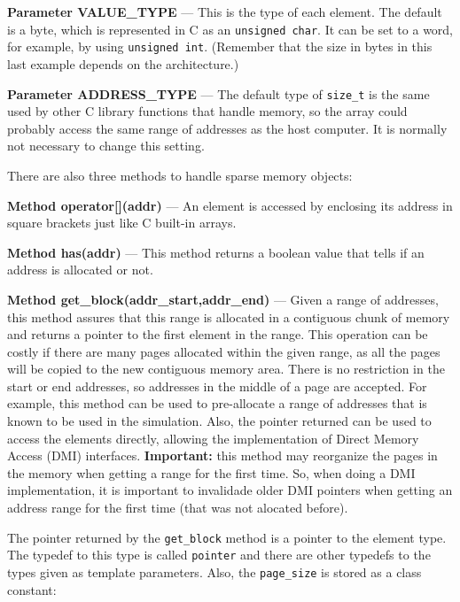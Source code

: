 \documentclass[12pt,oneside]{gsbook}
\begin{document}
\textbf{Parameter VALUE\_TYPE} --- This is the type of each
element. The default is a byte, which is represented in C as an
\texttt{unsigned char}. It can be set to a word, for example, by using
\texttt{unsigned int}. (Remember that the size in bytes in this
last example depends on the architecture.)

\textbf{Parameter ADDRESS\_TYPE} --- The default type of
\texttt{size\_t} is the same used by other C library functions that
handle memory, so the array could probably access the same range of
addresses as the host computer. It is normally not necessary to change
this setting.

\vspace{5pt}

There are also three methods to handle sparse memory objects:

\vspace{5pt}

\textbf{Method operator[](addr)} --- An element is accessed by
enclosing its address in square brackets just like C built-in arrays.

\textbf{Method has(addr)} --- This method returns a boolean value that
tells if an address is allocated or not.

\textbf{Method get\_block(addr\_start,addr\_end)} --- Given a range of
addresses, this method assures that this range is allocated in a
contiguous chunk of memory and returns a pointer to the first element
in the range. This operation can be costly if there are many pages
allocated within the given range, as all the pages will be copied to
the new contiguous memory area. There is no restriction in the start
or end addresses, so addresses in the middle of a page are
accepted. For example, this method can be used to pre-allocate a range
of addresses that is known to be used in the simulation. Also, the
pointer returned can be used to access the elements directly, allowing
the implementation of Direct Memory Access (DMI)
interfaces. \textbf{Important:} this method may reorganize the pages
in the memory when getting a range for the first time. So, when doing
a DMI implementation, it is important to invalidade older DMI pointers
when getting an address range for the first time (that was not
alocated before).

\vspace{5pt}

The pointer returned by the \texttt{get\_block} method is a pointer to
the element type. The typedef to this type is called \texttt{pointer}
and there are other typedefs to the types given as template
parameters. Also, the \texttt{page\_size} is stored as a class
constant:
\end{document}
